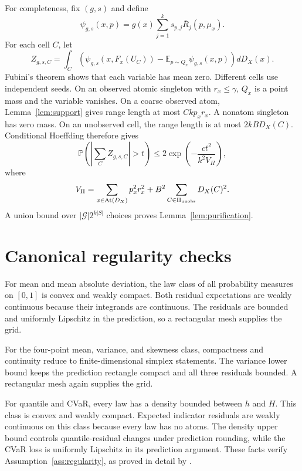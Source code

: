 \documentclass{article}
\theoremstyle{definition}
\theoremstyle{remark}
\newcommand{\E}{\mathbb E}
\newcommand{\Prb}{\mathbb P}
\newcommand{\1}{\mathbf 1}
\newcommand{\cG}{\mathcal G}
\newcommand{\At}{\operatorname{At}}
\begin{document}
For completeness, fix $(g,s)$ and define
\[
\psi_{g,s}(x,p)=g(x)\sum_{j=1}^ks_{p,j}\bar R_j(p,\mu_x).
\]
For each cell $C$, let
\[
Z_{g,s,C}=\int_C\left(\psi_{g,s}(x,F_x(U_C))-
\E_{p\sim Q_x}\psi_{g,s}(x,p)\right)dD_X(x).
\]
Fubini's theorem shows that each variable has mean zero. Different cells use independent seeds. On an observed atomic singleton with $r_x\le\gamma$, $Q_x$ is a point mass and the variable vanishes. On a coarse observed atom, Lemma~\ref{lem:support} gives range length at most $Ckp_xr_x$. A nonatom singleton has zero mass. On an unobserved cell, the range length is at most $2kBD_X(C)$. Conditional Hoeffding therefore gives
\[
\Prb\!\left(\left|\sum_CZ_{g,s,C}\right|>t\right)
\le2\exp\!\left(-\frac{ct^2}{k^2V_\Pi}\right),
\]
where
\[
V_\Pi=\sum_{x\in\At(D_X)}p_x^2r_x^2+
B^2\sum_{C\in\Pi_{\rm unobs}}D_X(C)^2.
\]
A union bound over $|\cG|2^{k|S|}$ choices proves Lemma~\ref{lem:purification}.

\section{Canonical regularity checks}\label{app:canonical}

For mean and mean absolute deviation, the law class of all probability measures on $[0,1]$ is convex and weakly compact. Both residual expectations are weakly continuous because their integrands are continuous. The residuals are bounded and uniformly Lipschitz in the prediction, so a rectangular mesh supplies the grid.

For the four-point mean, variance, and skewness class, compactness and continuity reduce to finite-dimensional simplex statements. The variance lower bound keeps the prediction rectangle compact and all three residuals bounded. A rectangular mesh again supplies the grid.

For quantile and CVaR, every law has a density bounded between $h$ and $H$. This class is convex and weakly compact. Expected indicator residuals are weakly continuous on this class because every law has no atoms. The density upper bound controls quantile-residual changes under prediction rounding, while the CVaR loss is uniformly Lipschitz in its prediction argument. These facts verify Assumption~\ref{ass:regularity}, as proved in detail by \citet{lu2026multilevel}.
\end{document}
